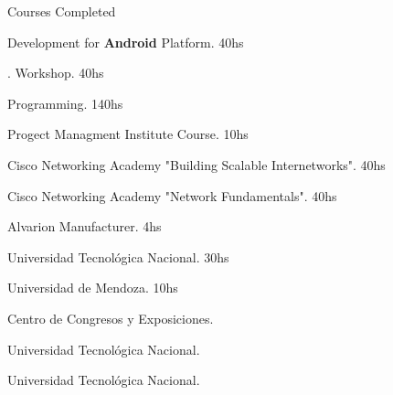 \begin{rubric}{Courses Completed}


\entry*[Year 2012]
	Development for {\bfseries Android} Platform. 40hs

. Workshop. 40hs

 Programming. 140hs 

 Progect Managment Institute Course. 10hs

 Cisco Networking Academy "Building Scalable Internetworks". 40hs

 Cisco Networking Academy "Network Fundamentals".  40hs

 Alvarion Manufacturer. 4hs

 Universidad Tecnológica Nacional. 30hs

 Universidad de Mendoza. 10hs

 Centro de Congresos y Exposiciones.

 Universidad Tecnológica Nacional.

 Universidad Tecnológica Nacional.

\end{rubric}
